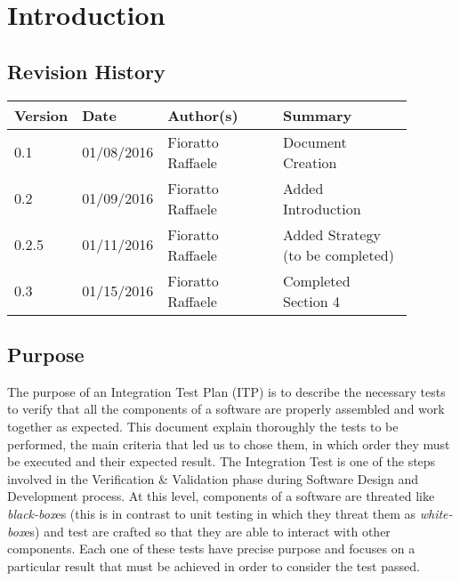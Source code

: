 \newpage
\section{Introduction}
\subsection{Revision History}
\begin{table}[H]
	\centering
	\begin{tabular*}{\linewidth}{|p{0.1\linewidth}|p{0.13\linewidth}|p{0.3099\linewidth}|p{0.3499\linewidth}|}
		\hline
		\textbf{Version} & \textbf{Date}       & \textbf{Author(s)}         & \textbf{Summary}           \\ \hline
		0.1     & 01/08/2016 & Fioratto Raffaele & Document Creation \\ \hline
		0.2		& 01/09/2016 & Fioratto Raffaele & Added Introduction \\ \hline
		0.2.5	& 01/11/2016 & Fioratto Raffaele & Added Strategy (to be completed) \\ \hline 
		0.3		& 01/15/2016 & Fioratto Raffaele & Completed Section 4 \\ \hline
	\end{tabular*}
\end{table}
\break
\subsection{Purpose}
The purpose of an Integration Test Plan (ITP) is to describe the necessary tests to verify that all the components of a software are properly assembled and work together as expected. This document explain thoroughly the tests to be performed, the main criteria that led us to chose them, in which order they must be executed and their expected result. The Integration Test is one of the steps involved in the Verification \& Validation phase during Software Design and Development process. At this level, components of a software are threated like \textit{black-box}es (this is in contrast to unit testing in which they threat them as \textit{white-box}es) and test are crafted so that they are able to interact with other components. Each one of these tests have precise purpose and focuses on a particular result that must be achieved in order to consider the test passed.
